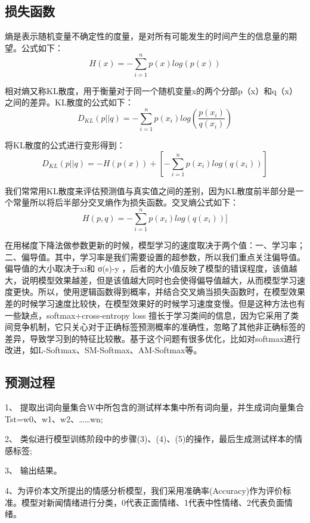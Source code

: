 \documentclass[twocolumn]{ctexart}
\begin{document}
\subsection{损失函数}
熵是表示随机变量不确定性的度量，是对所有可能发生的时间产生的信息量的期望。公式如下：
\begin{equation}
H(x) = -\sum_{i=1}^{n}p(x)log(p(x))
\end{equation}



\par 相对熵又称KL散度，用于衡量对于同一个随机变量x的两个分部p（x）和q（x）之间的差异。KL散度的公式如下：
\begin{equation}
D_{KL}(p||q)=-\sum_{i=1}^{n}p(x_i)log(\frac{p(x_i)}{q(x_i)})
\end{equation}
\par 将KL散度的公式进行变形得到：
\begin{equation}
D_{KL}(p||q)=-H(p(x))+[-\sum_{i=1}^{n}p(x_i)log(q(x_i))]
\end{equation}

\par 我们常常用KL散度来评估预测值与真实值之间的差别，因为KL散度前半部分是一个常量所以将后半部分交叉熵作为损失函数。交叉熵公式如下：
\begin{equation}
H(p,q)=-\sum_{i=1}^{n}p(x_i)log(q(x_i))]
\end{equation}
\par 在用梯度下降法做参数更新的时候，模型学习的速度取决于两个值：一、学习率；二、偏导值。其中，学习率是我们需要设置的超参数，所以我们重点关注偏导值。偏导值的大小取决于xi和 σ(s)-y ，后者的大小值反映了模型的错误程度，该值越大，说明模型效果越差，但是该值越大同时也会使得偏导值越大，从而模型学习速度更快。所以，使用逻辑函数得到概率，并结合交叉熵当损失函数时，在模型效果差的时候学习速度比较快，在模型效果好的时候学习速度变慢。但是这种方法也有一些缺点，softmax+cross-entropy loss 擅长于学习类间的信息，因为它采用了类间竞争机制，它只关心对于正确标签预测概率的准确性，忽略了其他非正确标签的差异，导致学习到的特征比较散。基于这个问题有很多优化，比如对softmax进行改进，如L-Softmax、SM-Softmax、AM-Softmax等。

\subsection{预测过程}
\par 1、
提取出词向量集合W中所包含的测试样本集中所有词向量，并生成词向量集合Tst={w0、w1、w2、……wn};
\par 2、
类似进行模型训练阶段中的步骤(3)、(4)、(5)的操作，最后生成测试样本的情感标签;
\par 3、
输出结果。
\par 4、为评价本文所提出的情感分析模型，我们采用准确率(Accuracy)作为评价标准。模型对新闻情绪进行分类，0代表正面情绪、1代表中性情绪、2代表负面情绪。
\end{document}
